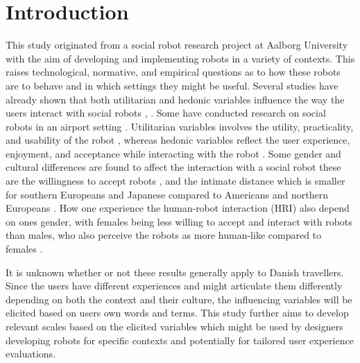 \section{Introduction}
\label{Introduction}
%
This study originated from a social robot research project at Aalborg University with the aim of developing and implementing robots in a variety of contexts. This raises technological, normative, and empirical questions as to how these robots are to behave and in which settings they might be useful. Several studies have already shown that both utilitarian and hedonic variables influence the way the users interact with social robots \cite{PDF:ExploringInfluencingVariable}, \cite{PDF:SharingALifeHarvey}. Some have conducted research on social robots in an airport setting \cite{PDF:InvestigatingPositioning}. Utilitarian variables involves the utility, practicality, and usability of the robot \cite{PDF:ExploringInfluencingVariable}, whereas hedonic variables reflect the user experience, enjoyment, and acceptance while interacting with the robot \cite{PDF:ExploringInfluencingVariable}. Some gender and cultural differences are found to affect the interaction with a social robot these are the willingness to accept robots \cite{PDF:InTheCompanyofRobots}, and the intimate distance which is smaller for southern Europeans and Japanese compared to Americans and northern Europeans \cite{PDF:HowMayIServeYou}. How one experience the human-robot interaction (HRI) also depend on ones gender, with females being less willing to accept and interact with robots than males, who also perceive the robots as more human-like compared to females \cite{PDF:ExploringInfluencingVariable}.

It is unknown whether or not these results generally apply to Danish travellers. Since the users have different experiences and might articulate them differently depending on both the context and their culture, the influencing variables will be elicited based on users own words and terms. This study further aims to develop relevant scales based on the elicited variables which might be used by designers developing robots for specific contexts and potentially for tailored user experience evaluations.




